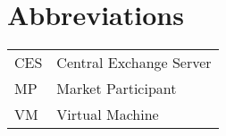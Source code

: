 \chapter{Abbreviations}
\begin{table}[h]
\begin{tabular}{ll}
CES & Central Exchange Server \label{abbr:CES}\\
MP & Market Participant \label{abbr:MP}\\
VM & Virtual Machine \label{abbr:VM}\\
\end{tabular}
\end{table}


